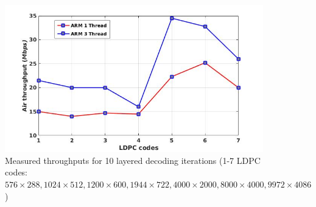\documentclass[10pt,a4paper]{article}
\begin{document}
\begin{figure}[H]
\begin{centering}
\includegraphics[scale=0.43]{air.jpg}
\caption[width=.5\textwidth]{Measured throughputs for 10 layered decoding iterations (1-7 LDPC codes: $576 \times 288, 1024 \times 512, 1200 \times 600, 1944 \times 722, 4000 \times 2000, 8000 \times 4000, 9972 \times 4086$)}\label{fig::air}
\end{centering}
\end{figure}
\end{document}

